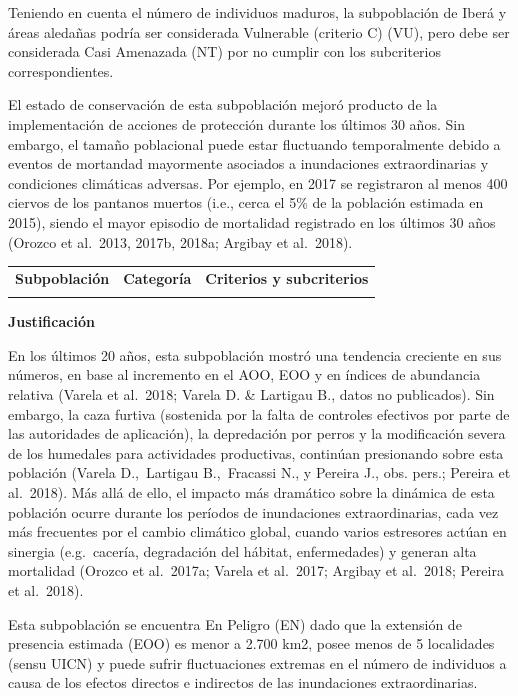 \documentclass[
  x11names]{article}
\begin{document}
Teniendo en cuenta el número de individuos maduros, la subpoblación de
Iberá y áreas aledañas podría ser considerada Vulnerable (criterio C)
(VU), pero debe ser considerada Casi Amenazada (NT) por no cumplir con
los subcriterios correspondientes.

El estado de conservación de esta subpoblación mejoró producto de la
implementación de acciones de protección durante los últimos 30 años.
Sin embargo, el tamaño poblacional puede estar fluctuando temporalmente
debido a eventos de mortandad mayormente asociados a inundaciones
extraordinarias y condiciones climáticas adversas. Por ejemplo, en 2017
se registraron al menos 400 ciervos de los pantanos muertos (i.e., cerca
el 5\% de la población estimada en 2015), siendo el mayor episodio de
mortalidad registrado en los últimos 30 años (Orozco et al.~2013, 2017b,
2018a; Argibay et al.~2018).\vspace{0.5cm}

\begin{tabu} to 
\toprule
\textbf{Subpoblación} & \textbf{Categoría} & \textbf{Criterios y subcriterios}\\
\midrule
{} &  & \\
\bottomrule
\end{tabu}

\textbf{Justificación}

En los últimos 20 años, esta subpoblación mostró una tendencia creciente
en sus números, en base al incremento en el AOO, EOO y en índices de
abundancia relativa (Varela et al.~2018; Varela D. \& Lartigau B., datos
no publicados). Sin embargo, la caza furtiva (sostenida por la falta de
controles efectivos por parte de las autoridades de aplicación), la
depredación por perros y la modificación severa de los humedales para
actividades productivas, continúan presionando sobre esta población
(Varela D.,~Lartigau B.,~Fracassi N., y Pereira J., obs. pers.; Pereira
et al.~2018). Más allá de ello, el impacto más dramático sobre la
dinámica de esta población ocurre durante los períodos de inundaciones
extraordinarias, cada vez más frecuentes por el cambio climático global,
cuando varios estresores actúan en sinergia (e.g.~cacería, degradación
del hábitat, enfermedades) y generan alta mortalidad (Orozco et
al.~2017a; Varela et al.~2017; Argibay et al.~2018; Pereira et
al.~2018).

Esta subpoblación se encuentra En Peligro (EN) dado que la extensión de
presencia estimada (EOO) es menor a 2.700 km2, posee menos de 5
localidades (sensu UICN) y puede sufrir fluctuaciones extremas en el
número de individuos a causa de los efectos directos e indirectos de las
inundaciones extraordinarias.\vspace{0.5cm}
\end{document}
